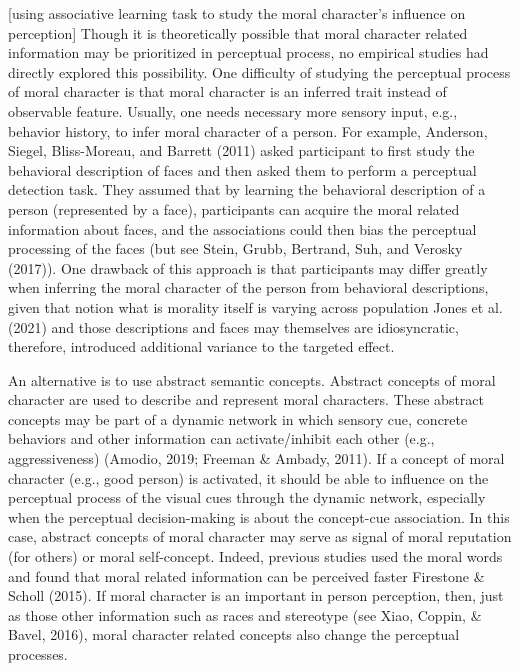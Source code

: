 \documentclass[
  english,
  man]{apa6}
\begin{document}
{[}using associative learning task to study the moral character's influence on perception{]} Though it is theoretically possible that moral character related information may be prioritized in perceptual process, no empirical studies had directly explored this possibility. One difficulty of studying the perceptual process of moral character is that moral character is an inferred trait instead of observable feature. Usually, one needs necessary more sensory input, e.g., behavior history, to infer moral character of a person. For example, Anderson, Siegel, Bliss-Moreau, and Barrett (2011) asked participant to first study the behavioral description of faces and then asked them to perform a perceptual detection task. They assumed that by learning the behavioral description of a person (represented by a face), participants can acquire the moral related information about faces, and the associations could then bias the perceptual processing of the faces (but see Stein, Grubb, Bertrand, Suh, and Verosky (2017)). One drawback of this approach is that participants may differ greatly when inferring the moral character of the person from behavioral descriptions, given that notion what is morality itself is varying across population Jones et al. (2021) and those descriptions and faces may themselves are idiosyncratic, therefore, introduced additional variance to the targeted effect.

An alternative is to use abstract semantic concepts. Abstract concepts of moral character are used to describe and represent moral characters. These abstract concepts may be part of a dynamic network in which sensory cue, concrete behaviors and other information can activate/inhibit each other (e.g., aggressiveness) (Amodio, 2019; Freeman \& Ambady, 2011). If a concept of moral character (e.g., good person) is activated, it should be able to influence on the perceptual process of the visual cues through the dynamic network, especially when the perceptual decision-making is about the concept-cue association. In this case, abstract concepts of moral character may serve as signal of moral reputation (for others) or moral self-concept. Indeed, previous studies used the moral words and found that moral related information can be perceived faster Firestone \& Scholl (2015). If moral character is an important in person perception, then, just as those other information such as races and stereotype (see Xiao, Coppin, \& Bavel, 2016), moral character related concepts also change the perceptual processes.
\end{document}
